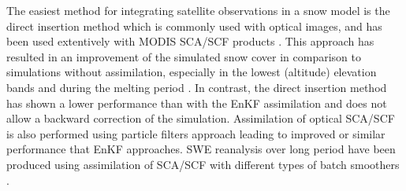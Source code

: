 \documentclass[utf8]{frontiersSCNS} %
\begin{document}

The easiest method for integrating satellite observations in a snow model is the direct insertion method which is commonly used with optical images, and has been used extentively with MODIS SCA/SCF products \citep{Rodell_2004,Kumar_2008,Hall_2010,Fletcher_2012,Liu_2013}. %
This approach has resulted in an improvement of the simulated snow cover in comparison to simulations without assimilation, especially in the lowest (altitude) elevation bands and during the melting period \citep{Andreadis_2006,Arsenault_2013}. In contrast, the direct insertion method has shown a lower performance than with the EnKF assimilation  \citep{Arsenault_2013, Thirel_2011} and does not allow a backward correction of the simulation. Assimilation of optical SCA/SCF is also performed using particle filters approach \citep[e.g.][]{Thirel_2013, Baba_2018} leading to improved or similar performance that EnKF approaches. SWE reanalysis over long period have been produced using assimilation of SCA/SCF with different types of batch smoothers \citep[e.g.][]{Girotto_2014,Margulis_2015,Cortes_2017,Aalstad_2018}.
\end{document}
